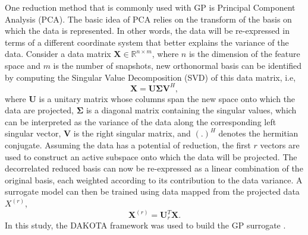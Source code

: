 \documentclass{anstrans}
\begin{document}
One reduction method that is commonly used with GP  is Principal Component Analysis (PCA).  The basic idea of PCA relies on the transform of the basis on which the data is represented. In other words, the data will be re-expressed in terms of a different coordinate system that better explains the variance of the data. 
Consider a data matrix $\mathbf{X}\in \mathbb{R}^{n\times m}$, where $n$ is the dimension of the feature space and $m$ is the number of snapshots, new orthonormal basis can be identified by computing the Singular Value Decomposition (SVD) of this data matrix, i.e,
\begin{equation}\label{svd}
 {\mathbf{X = U\Sigma V}}^H,
 \end{equation}
where \textbf{U} is a unitary matrix whose columns span the new space onto which the data are projected, $\boldsymbol{\Sigma}$ is a diagonal matrix containing the singular values, which can be interpreted as the variance of the data along the corresponding left singular vector, \textbf{V} is the right singular matrix, and $(.)^{H}$ denotes the hermitian conjugate.
Assuming the data has a potential of reduction, the first $r$ vectors are used to construct an active subspace onto which the data will be projected.
The  decorrelated reduced basis can now be re-expressed as a linear combination of the original basis, each weighted according to its contribution to the data variance. A surrogate model can then be trained using data  mapped from the projected  data $X^{(r)}$,
\begin{equation}
\mathbf{X}^{(r)} = \mathbf{U}_r ^T \mathbf{X}.
\end{equation}
In this study, the DAKOTA framework was used to build the GP surrogate \cite{eldred2006dakota}.
\end{document}
